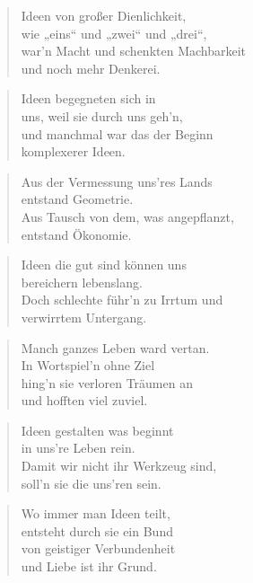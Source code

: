 \documentclass[10pt,a4paper]{article}
\begin{document}
\begin{paracol}{2}
\begin{verse}
Ideen von großer Dienlichkeit, \\
wie „eins“ und „zwei“ und „drei“, \\
war’n Macht und schenkten Machbarkeit \\
und noch mehr Denkerei. \\
\end{verse}

\begin{verse}
Ideen begegneten sich in \\
uns, weil sie durch uns geh’n, \\
und manchmal war das der Beginn \\
komplexerer Ideen. \\
\end{verse}

\begin{verse}
Aus der Vermessung uns’res Lands \\
entstand Geometrie. \\
Aus Tausch von dem, was angepflanzt, \\
entstand Ökonomie. \\
\end{verse}

\begin{verse}
Ideen die gut sind können uns \\
bereichern lebenslang. \\
Doch schlechte führ’n zu Irrtum und \\
verwirrtem Untergang. \\
\end{verse}

\begin{verse}
Manch ganzes Leben ward vertan. \\
In Wortspiel’n ohne Ziel \\
hing’n sie verloren Träumen an \\
und hofften viel zuviel. \\
\end{verse}

\begin{verse}
Ideen gestalten was beginnt \\
in uns’re Leben rein. \\
Damit wir nicht ihr Werkzeug sind, \\
soll’n sie die uns’ren sein. \\
\end{verse}

\begin{verse}
Wo immer man Ideen teilt, \\
entsteht durch sie ein Bund \\
von geistiger Verbundenheit \\
und Liebe ist ihr Grund. \\
\end{verse}


\end{paracol}
\end{document}
